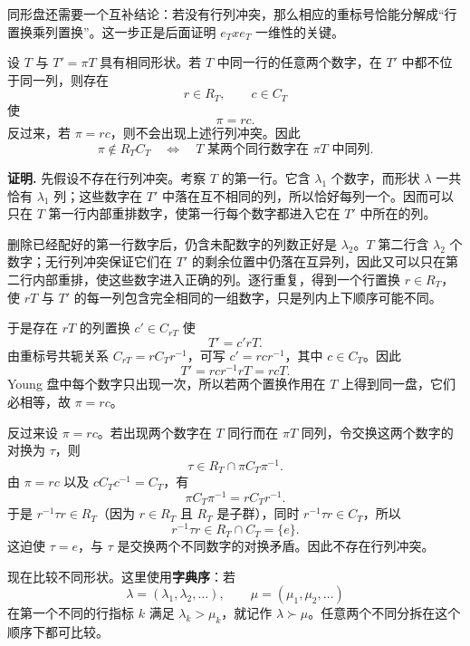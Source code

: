 同形盘还需要一个互补结论：若没有行列冲突，那么相应的重标号恰能分解成“行置换乘列置换”。这一步正是后面证明 $e_Txe_T$ 一维性的关键。

\begin{lemma}[同形盘的行列分解判据]
设 $T$ 与 $T'=\pi T$ 具有相同形状。若 $T$ 中同一行的任意两个数字，在 $T'$ 中都不位于同一列，则存在
\[
r\in R_T,\qquad c\in C_T
\]
使
\begin{equation}
\pi=rc.
\label{eq:row-column-factorization}
\end{equation}
反过来，若 $\pi=rc$，则不会出现上述行列冲突。因此
\[
\pi\notin R_TC_T
\quad\Longleftrightarrow\quad
\text{$T$ 某两个同行数字在 $\pi T$ 中同列}.
\]

\par\smallskip\noindent\textbf{证明.}
先假设不存在行列冲突。考察 $T$ 的第一行。它含 $\lambda_1$ 个数字，而形状 $\lambda$ 一共恰有 $\lambda_1$ 列；这些数字在 $T'$ 中落在互不相同的列，所以恰好每列一个。因而可以只在 $T$ 第一行内部重排数字，使第一行每个数字都进入它在 $T'$ 中所在的列。

删除已经配好的第一行数字后，仍含未配数字的列数正好是 $\lambda_2$。$T$ 第二行含 $\lambda_2$ 个数字；无行列冲突保证它们在 $T'$ 的剩余位置中仍落在互异列，因此又可以只在第二行内部重排，使这些数字进入正确的列。逐行重复，得到一个行置换 $r\in R_T$，使 $rT$ 与 $T'$ 的每一列包含完全相同的一组数字，只是列内上下顺序可能不同。

于是存在 $rT$ 的列置换 $c'\in C_{rT}$ 使
\[
T'=c'rT.
\]
由重标号共轭关系 $C_{rT}=rC_Tr^{-1}$，可写 $c'=rcr^{-1}$，其中 $c\in C_T$。因此
\[
T'=rcr^{-1}rT=rcT.
\]
Young 盘中每个数字只出现一次，所以若两个置换作用在 $T$ 上得到同一盘，它们必相等，故 $\pi=rc$。

反过来设 $\pi=rc$。若出现两个数字在 $T$ 同行而在 $\pi T$ 同列，令交换这两个数字的对换为 $\tau$，则
\[
\tau\in R_T\cap \pi C_T\pi^{-1}.
\]
由 $\pi=rc$ 以及 $cC_Tc^{-1}=C_T$，有
\[
\pi C_T\pi^{-1}=rC_Tr^{-1}.
\]
于是 $r^{-1}\tau r\in R_T$（因为 $r\in R_T$ 且 $R_T$ 是子群），同时 $r^{-1}\tau r\in C_T$，所以
\[
r^{-1}\tau r\in R_T\cap C_T=\{e\}.
\]
这迫使 $\tau=e$，与 $\tau$ 是交换两个不同数字的对换矛盾。因此不存在行列冲突。
\end{lemma}

现在比较不同形状。这里使用\textbf{字典序}：若
\[
\lambda=(\lambda_1,\lambda_2,\dots),\qquad
\mu=(\mu_1,\mu_2,\dots)
\]
在第一个不同的行指标 $k$ 满足 $\lambda_k>\mu_k$，就记作 $\lambda\succ\mu$。任意两个不同分拆在这个顺序下都可比较。

